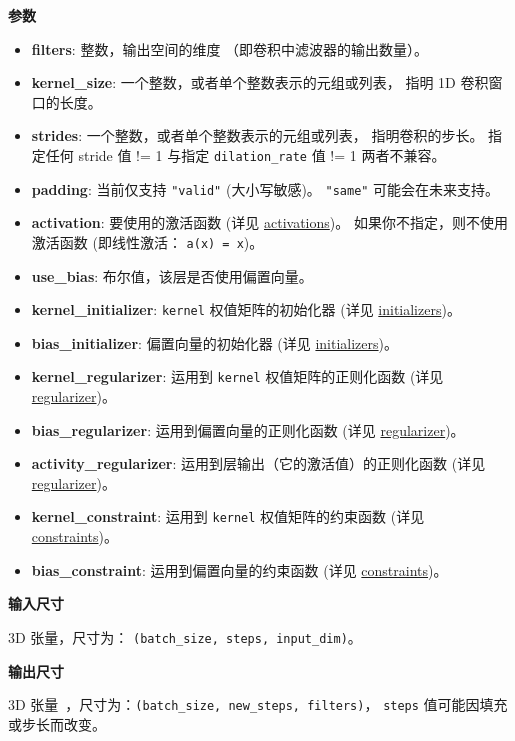 \textbf{参数}

\begin{itemize}
\tightlist
\item
  \textbf{filters}: 整数，输出空间的维度 （即卷积中滤波器的输出数量）。
\item
  \textbf{kernel\_size}: 一个整数，或者单个整数表示的元组或列表， 指明
  1D 卷积窗口的长度。
\item
  \textbf{strides}: 一个整数，或者单个整数表示的元组或列表，
  指明卷积的步长。 指定任何 stride 值 != 1 与指定
  \texttt{dilation\_rate} 值 != 1 两者不兼容。
\item
  \textbf{padding}: 当前仅支持 \texttt{"valid"} (大小写敏感)。
  \texttt{"same"} 可能会在未来支持。
\item
  \textbf{activation}: 要使用的激活函数 (详见
  \hyperref[activations]{activations})。
  如果你不指定，则不使用激活函数 (即线性激活： \texttt{a(x)\ =\ x})。
\item
  \textbf{use\_bias}: 布尔值，该层是否使用偏置向量。
\item
  \textbf{kernel\_initializer}: \texttt{kernel} 权值矩阵的初始化器 (详见
  \hyperref[initializers]{initializers})。
\item
  \textbf{bias\_initializer}: 偏置向量的初始化器 (详见
  \hyperref[initializers]{initializers})。
\item
  \textbf{kernel\_regularizer}: 运用到 \texttt{kernel}
  权值矩阵的正则化函数 (详见 \hyperref[regularizers]{regularizer})。
\item
  \textbf{bias\_regularizer}: 运用到偏置向量的正则化函数 (详见
  \hyperref[regularizers]{regularizer})。
\item
  \textbf{activity\_regularizer}: 运用到层输出（它的激活值）的正则化函数
  (详见 \hyperref[regularizers]{regularizer})。
\item
  \textbf{kernel\_constraint}: 运用到 \texttt{kernel} 权值矩阵的约束函数
  (详见 \hyperref[constraints]{constraints})。
\item
  \textbf{bias\_constraint}: 运用到偏置向量的约束函数 (详见
  \hyperref[constraints]{constraints})。
\end{itemize}

\textbf{输入尺寸}

3D 张量，尺寸为： \texttt{(batch\_size,\ steps,\ input\_dim)}。

\textbf{输出尺寸}

3D 张量~，尺寸为：\texttt{(batch\_size,\ new\_steps,\ filters)}，
\texttt{steps} 值可能因填充或步长而改变。



